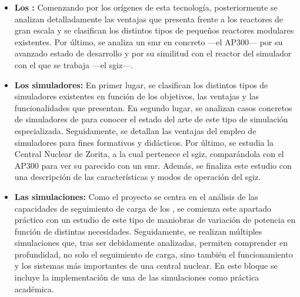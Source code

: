 \begin{itemize}
  \item \textbf{Los :} Comenzando por los orígenes de esta tecnología, posteriormente se analizan detalladamente las ventajas que presenta frente a los reactores de gran escala y se clasifican los distintos tipos de pequeños reactores modulares existentes. Por último, se analiza un \acrshort{smr} en concreto ---el AP300--- por su avanzado estado de desarrollo y por su similitud con el reactor del simulador con el que se trabaja ---el \acrshort{sgiz}---.
  \item \textbf{Los simuladores:} En primer lugar, se clasifican los distintos tipos de simuladores existentes en función de los objetivos, las ventajas y las funcionalidades que presentan. En segundo lugar, se analizan casos concretos de simuladores de  para conocer el estado del arte de este tipo de simulación especializada. Seguidamente, se detallan las ventajas del empleo de simuladores para fines formativos y didácticos. Por último, se estudia la Central Nuclear de Zorita, a la cual pertenece el \acrshort{sgiz}, comparándola con el AP300 para ver su parecido con un \acrshort{smr}. Además, se finaliza este estudio con una descripción de las características y modos de operación del \acrshort{sgiz}.
  \item \textbf{Las simulaciones:} Como el proyecto se centra en el análisis de las capacidades de seguimiento de carga de los , se comienza este apartado práctico con un estudio de este tipo de maniobras de variación de potencia en función de distintas necesidades. Seguidamente, se realizan múltiples simulaciones que, tras ser debidamente analizadas, permiten comprender en profundidad, no solo el seguimiento de carga, sino también el funcionamiento y los  sistemas más importantes de una central nuclear. En este bloque se incluye la implementación de una de las simulaciones como práctica académica.
\end{itemize}